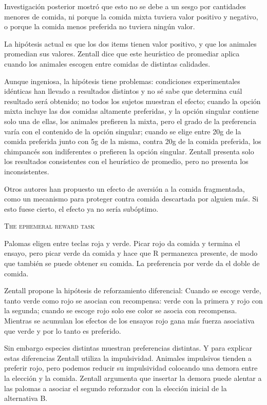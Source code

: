 \documentclass[a4paper,12pt]{article}
\begin{document}
Investigación posterior mostró que esto no se debe a un sesgo por cantidades menores de comida, ni porque la comida mixta tuviera valor positivo y negativo, o porque la comida menos preferida no tuviera ningún valor.

La hipótesis actual es que los dos items tienen valor positivo, y que los animales promedian sus valores. Zentall dice que este heurístico de promediar aplica cuando los animales escogen entre comidas de distintas calidades.

Aunque ingeniosa, la hipótesis tiene problemas: condiciones experimentales idénticas han llevado a resultados distintos y no sé sabe que determina cuál resultado será obtenido; no todos los sujetos muestran el efecto; cuando la opción mixta incluye las dos comidas altamente preferidas, y la opción singular contiene solo una de ellas, los animales prefieren la mixta, pero el grado de la preferencia varía con el contenido de la opción singular; cuando se elige entre 20g de la comida preferida junto con 5g de la misma, contra 20g de la comida preferida, los chimpancés son indiferentes o prefieren la opción singular. Zentall presenta solo los resultados consistentes con el heurístico de promedio, pero no presenta los inconsistentes.

Otros autores han propuesto un efecto de aversión a la comida fragmentada, como un mecanismo para proteger contra comida descartada por alguien más. Si esto fuese cierto, el efecto ya no sería subóptimo.

{\scshape The ephemeral reward task}

Palomas eligen entre teclas roja y verde. Picar rojo da comida y termina el ensayo, pero picar verde da comida y hace que R permanezca presente, de modo que también se puede obtener su comida. La preferencia por verde da el doble de comida.

Zentall propone la hipótesis de reforzamiento diferencial: Cuando se escoge verde, tanto verde como rojo se asocian con recompensa: verde con la primera y rojo con la segunda; cuando se escoge rojo solo ese color se asocia con recompensa. Mientras se acumulan los efectos de los ensayos rojo gana más fuerza asociativa que verde y por lo tanto es preferido.

Sin embargo especies distintas muestran preferencias distintas. Y para explicar estas diferencias Zentall utiliza la impulsividad. Animales impulsivos tienden a preferir rojo, pero podemos reducir su impulsividad colocando una demora entre la elección y la comida. Zentall argumenta que insertar la demora puede alentar a las palomas a asociar el segundo reforzador con la elección inicial de la alternativa B.
\end{document}
